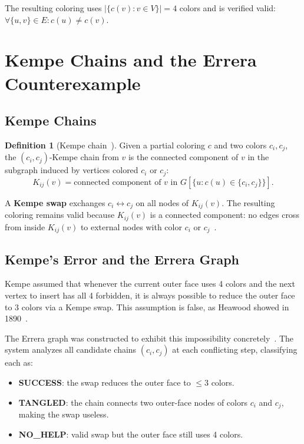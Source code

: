 \documentclass[12pt,letterpaper]{article}
\theoremstyle{plain}
\theoremstyle{definition}
\newtheorem{definition}[theorem]{Definition}
\theoremstyle{remark}
\begin{document}
The resulting coloring uses $|\{c(v) : v \in V\}| = 4$ colors and is verified
valid: $\forall \{u,v\} \in E: c(u) \neq c(v)$.

\section{Kempe Chains and the Errera Counterexample}
\label{sec:kempe}

\subsection{Kempe Chains}

\begin{definition}[Kempe chain~\cite{kempe1879}]
Given a partial coloring $c$ and two colors $c_i, c_j$, the
$(c_i, c_j)$-Kempe chain from $v$ is the connected component of $v$ in the
subgraph induced by vertices colored $c_i$ or $c_j$:
\begin{equation}
    K_{ij}(v) = \text{connected component of } v \text{ in }
    G[\{u : c(u) \in \{c_i, c_j\}\}].
\end{equation}
\end{definition}

A \textbf{Kempe swap} exchanges $c_i \leftrightarrow c_j$ on all nodes of
$K_{ij}(v)$. The resulting coloring remains valid because $K_{ij}(v)$ is a
connected component: no edges cross from inside $K_{ij}(v)$ to external nodes
with color $c_i$ or $c_j$~\cite{kempe1879}.

\subsection{Kempe's Error and the Errera Graph}

Kempe assumed that whenever the current outer face uses 4 colors and the next
vertex to insert has all 4 forbidden, it is always possible to reduce the outer
face to 3 colors via a Kempe swap. This assumption is false, as Heawood showed
in 1890~\cite{heawood1890}.

The Errera graph was constructed to exhibit this impossibility
concretely~\cite{errera1921}. The system analyzes all candidate chains $(c_i,
c_j)$ at each conflicting step, classifying each as:

\begin{itemize}[noitemsep]
    \item \textbf{SUCCESS}: the swap reduces the outer face to $\leq 3$ colors.
    \item \textbf{TANGLED}: the chain connects two outer-face nodes of colors
        $c_i$ and $c_j$, making the swap useless.
    \item \textbf{NO\_HELP}: valid swap but the outer face still uses 4 colors.
\end{itemize}
\end{document}
